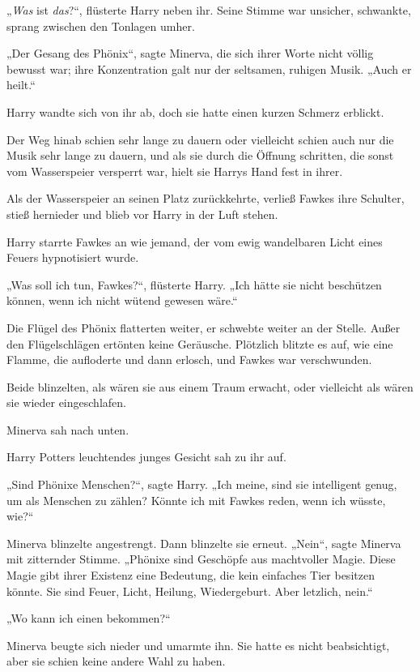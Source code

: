 „\emph{Was} ist \emph{das}?“, flüsterte Harry neben ihr. Seine Stimme war unsicher, schwankte, sprang zwischen den Tonlagen umher. 

„Der Gesang des Phönix“, sagte Minerva, die sich ihrer Worte nicht völlig bewusst war; ihre Konzentration galt nur der seltsamen, ruhigen Musik. „Auch er heilt.“ 

Harry wandte sich von ihr ab, doch sie hatte einen kurzen Schmerz erblickt. 

Der Weg hinab schien sehr lange zu dauern oder vielleicht schien auch nur die Musik sehr lange zu dauern, und als sie durch die Öffnung schritten, die sonst vom Wasserspeier versperrt war, hielt sie Harrys Hand fest in ihrer. 

Als der Wasserspeier an seinen Platz zurückkehrte, verließ Fawkes ihre Schulter, stieß hernieder und blieb vor Harry in der Luft stehen. 

Harry starrte Fawkes an wie jemand, der vom ewig wandelbaren Licht eines Feuers hypnotisiert wurde. 

„Was soll ich tun, Fawkes?“, flüsterte Harry. „Ich hätte sie nicht beschützen können, wenn ich nicht wütend gewesen wäre.“ 

Die Flügel des Phönix flatterten weiter, er schwebte weiter an der Stelle. Außer den Flügelschlägen ertönten keine Geräusche. Plötzlich blitzte es auf, wie eine Flamme, die aufloderte und dann erlosch, und Fawkes war verschwunden. 

Beide blinzelten, als wären sie aus einem Traum erwacht, oder vielleicht als wären sie wieder eingeschlafen. 

Minerva sah nach unten. 

Harry Potters leuchtendes junges Gesicht sah zu ihr auf. 

„Sind Phönixe Menschen?“, sagte Harry. „Ich meine, sind sie intelligent genug, um als Menschen zu zählen? Könnte ich mit Fawkes reden, wenn ich wüsste, wie?“ 

Minerva blinzelte angestrengt. Dann blinzelte sie erneut. „Nein“, sagte Minerva mit zitternder Stimme. „Phönixe sind Geschöpfe aus machtvoller Magie. Diese Magie gibt ihrer Existenz eine Bedeutung, die kein einfaches Tier besitzen könnte. Sie sind Feuer, Licht, Heilung, Wiedergeburt. Aber letzlich, nein.“ 

„Wo kann ich einen bekommen?“ 

Minerva beugte sich nieder und umarmte ihn. Sie hatte es nicht beabsichtigt, aber sie schien keine andere Wahl zu haben. 

